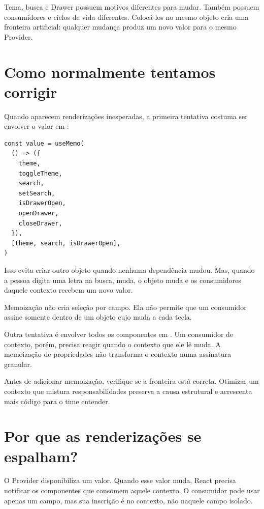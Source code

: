Tema, busca e Drawer possuem motivos diferentes para mudar. Também possuem
consumidores e ciclos de vida diferentes. Colocá-los no mesmo objeto cria uma
fronteira artificial: qualquer mudança produz um novo valor para o mesmo
Provider.

\section{Como normalmente tentamos corrigir}

Quando aparecem renderizações inesperadas, a primeira tentativa costuma ser
envolver o valor em :

\begin{lstlisting}
const value = useMemo(
  () => ({
    theme,
    toggleTheme,
    search,
    setSearch,
    isDrawerOpen,
    openDrawer,
    closeDrawer,
  }),
  [theme, search, isDrawerOpen],
)
\end{lstlisting}

Isso evita criar outro objeto quando nenhuma dependência mudou. Mas, quando a
pessoa digita uma letra na busca,  muda, o objeto muda e os
consumidores daquele contexto recebem um novo valor.

Memoização não cria seleção por campo. Ela não permite que um consumidor assine
somente  dentro de um objeto cujo  muda a cada
tecla.

Outra tentativa é envolver todos os componentes em . Um consumidor
de contexto, porém, precisa reagir quando o contexto que ele lê muda. A
memoização de propriedades não transforma o contexto numa assinatura granular.

\begin{decisao}
Antes de adicionar memoização, verifique se a fronteira está correta. Otimizar um
contexto que mistura responsabilidades preserva a causa estrutural e acrescenta
mais código para o time entender.
\end{decisao}

\section{Por que as renderizações se espalham?}

O Provider disponibiliza um valor. Quando esse valor muda, React precisa
notificar os componentes que consomem aquele contexto. O consumidor pode usar
apenas um campo, mas sua inscrição é no contexto, não naquele campo isolado.

